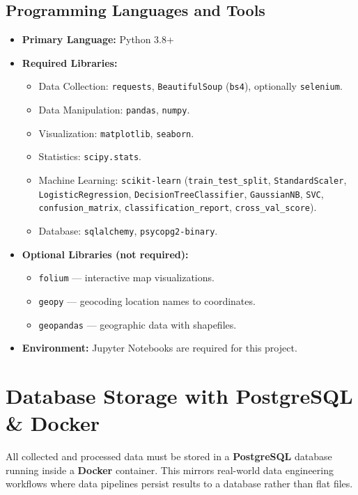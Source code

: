 \documentclass[11pt]{article}
\begin{document}
\subsection{Programming Languages and Tools}
\begin{itemize}
  \item \textbf{Primary Language:} Python 3.8+
  \item \textbf{Required Libraries:}
  \begin{itemize}
    \item Data Collection: \texttt{requests}, \texttt{BeautifulSoup} (\texttt{bs4}), optionally \texttt{selenium}.
    \item Data Manipulation: \texttt{pandas}, \texttt{numpy}.
    \item Visualization: \texttt{matplotlib}, \texttt{seaborn}.
    \item Statistics: \texttt{scipy.stats}.
    \item Machine Learning: \texttt{scikit-learn} (\texttt{train\_test\_split}, \texttt{StandardScaler}, \texttt{LogisticRegression}, \texttt{DecisionTreeClassifier}, \texttt{GaussianNB}, \texttt{SVC}, \texttt{confusion\_matrix}, \texttt{classification\_report}, \texttt{cross\_val\_score}).
    \item Database: \texttt{sqlalchemy}, \texttt{psycopg2-binary}.
  \end{itemize}
  \item \textbf{Optional Libraries (not required):}
  \begin{itemize}
    \item \texttt{folium} --- interactive map visualizations.
    \item \texttt{geopy} --- geocoding location names to coordinates.
    \item \texttt{geopandas} --- geographic data with shapefiles.
  \end{itemize}
  \item \textbf{Environment:} Jupyter Notebooks are required for this project.
\end{itemize}

\section{Database Storage with PostgreSQL \& Docker}

All collected and processed data must be stored in a \textbf{PostgreSQL} database running inside a \textbf{Docker} container. This mirrors real-world data engineering workflows where data pipelines persist results to a database rather than flat files.
\end{document}
